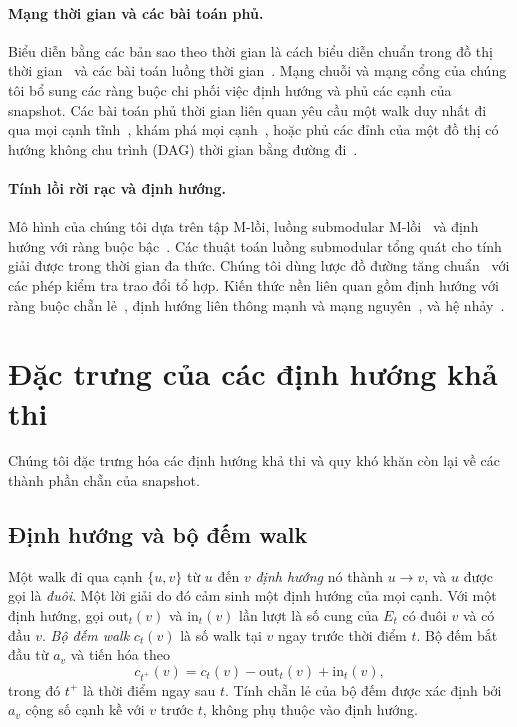 \documentclass[pdflatex,sn-mathphys-num]{sn-jnl}
\theoremstyle{thmstyleone}%
\theoremstyle{thmstyletwo}%
\theoremstyle{thmstylethree}%
\newcommand{\out}{\mathrm{out}}
\newcommand{\inn}{\mathrm{in}}
\begin{document}
\paragraph{Mạng thời gian và các bài toán phủ.}
Biểu diễn bằng các bản sao theo thời gian là cách biểu diễn chuẩn trong đồ thị thời gian~\cite{kostakos2009} và các bài toán luồng thời gian~\cite{akrida2019}. Mạng chuỗi và mạng cổng của chúng tôi bổ sung các ràng buộc chi phối việc định hướng và phủ các cạnh của snapshot. Các bài toán phủ thời gian liên quan yêu cầu một walk duy nhất đi qua mọi cạnh tĩnh~\cite{marino2023}, khám phá mọi cạnh~\cite{bumpus2023}, hoặc phủ các đỉnh của một đồ thị có hướng không chu trình (DAG) thời gian bằng đường đi~\cite{chakraborty2024}.

\paragraph{Tính lồi rời rạc và định hướng.}
Mô hình của chúng tôi dựa trên tập M-lồi, luồng submodular M-lồi~\cite{edmonds1977,murota1999,murota2003,fujishige2005} và định hướng với ràng buộc bậc~\cite{hakimi1965,frank2011}. Các thuật toán luồng submodular tổng quát cho tính giải được trong thời gian đa thức. Chúng tôi dùng lược đồ đường tăng chuẩn~\cite{fujishige2005} với các phép kiểm tra trao đổi tổ hợp. Kiến thức nền liên quan gồm định hướng với ràng buộc chẵn lẻ~\cite{frank2011}, định hướng liên thông mạnh và mạng nguyên~\cite{abdi2025}, và hệ nhảy~\cite{bouchet1995}.

\section{Đặc trưng của các định hướng khả thi}\label{sec:char}

Chúng tôi đặc trưng hóa các định hướng khả thi và quy khó khăn còn lại về các thành phần chẵn của snapshot.

\subsection{Định hướng và bộ đếm walk}

Một walk đi qua cạnh $\{u,v\}$ từ $u$ đến $v$ \emph{định hướng} nó thành $u\to v$, và $u$ được gọi là \emph{đuôi}. Một lời giải do đó cảm sinh một định hướng của mọi cạnh. Với một định hướng, gọi $\out_t(v)$ và $\inn_t(v)$ lần lượt là số cung của $E_t$ có đuôi $v$ và có đầu $v$. \emph{Bộ đếm walk} $c_t(v)$ là số walk tại $v$ ngay trước thời điểm $t$. Bộ đếm bắt đầu từ $a_v$ và tiến hóa theo
\[
  c_{t^+}(v)=c_t(v)-\out_t(v)+\inn_t(v),
\]
trong đó $t^+$ là thời điểm ngay sau $t$. Tính chẵn lẻ của bộ đếm được xác định bởi $a_v$ cộng số cạnh kề với $v$ trước $t$, không phụ thuộc vào định hướng.
\end{document}
